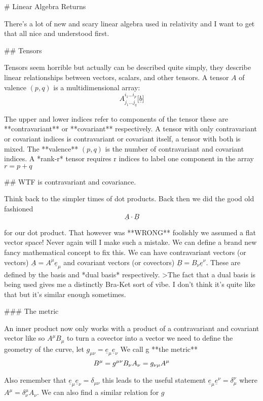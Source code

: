 # Linear Algebra Returns

There's a lot of new and scary linear algebra used in relativity and I want to get that all nice and understood first.

## Tensors

Tensors seem horrible but actually can be described quite simply, they describe linear relationships between vectors, scalars, and other tensors. A tensor $A$ of valence $(p,q)$ is a multidimensional array:
$$
A_{j_1...j_q}^{i_1...i_p}\big[\underline{b}\big]
$$

The upper and lower indices refer to components of the tensor these are **contravariant** or **covariant** respectively. A tensor with only contravariant or covariant indices is contravariant or covariant itself, a tensor with both is mixed. The **valence** $(p,q)$ is the number of contravariant and covariant indices. A *rank-r* tensor requires r indices to label one component in the array $r=p+q$

## WTF is contravariant and covariance.

Think back to the simpler times of dot products. Back then we did the good old fashioned
$$
\underline{A}\cdot \underline{B}
$$

for our dot product. That however was **WRONG** foolishly we assumed a flat vector space! Never again will I make such a mistake. We can define a brand new fancy mathematical concept to fix this. We can have contravariant vectors (or vectors) $\underline{A} = A^\mu\underline{e}_\mu$ and covariant vectors (or covectors) $\underline{B} = B_\nu\underline{e}^\nu$. These are defined by the basis and *dual basis* respectively.
>The fact that a dual basis is being used gives me a distinctly Bra-Ket sort of vibe. I don't think it's quite like that but it's similar enough sometimes.

### The metric

 An inner product now only works with a product of a contravariant and covariant vector like so $A^\mu B_\mu$ to turn a covector into a vector we need to define the geometry of the curve, let $g_{\mu\nu}=\underline{e}_\mu\underline{e}_\nu$ We call g **the metric**
$$
B^\mu = g^{\mu\nu}B_\nu\\
A_\nu = g_{\nu\mu}A^\mu\\
$$

Also remember that $\underline{e}_\mu\underline{e}_\nu = \delta_{\mu\nu}$ this leads to the useful statement $\underline{e}_\mu\underline{e}^\nu = \delta_\mu^\nu$ where $A^\mu = \delta^\mu_\nu A_\nu$. We can also find a similar relation for $g$


